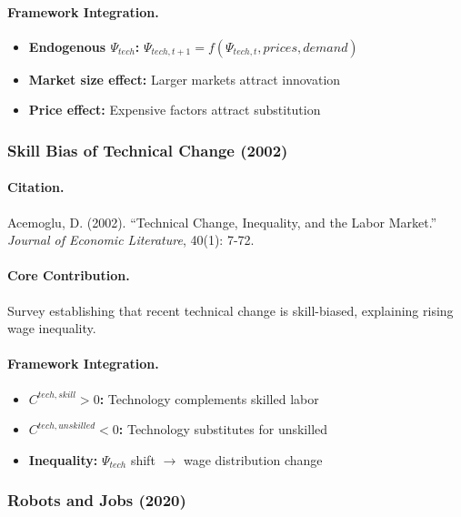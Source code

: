 \documentclass[12pt,a4paper]{article}
\begin{document}
\paragraph{Framework Integration.}
\begin{itemize}
  \item \textbf{Endogenous $\Psi_{tech}$:} $\Psi_{tech,t+1} = f(\Psi_{tech,t}, prices, demand)$
  \item \textbf{Market size effect:} Larger markets attract innovation
  \item \textbf{Price effect:} Expensive factors attract substitution
\end{itemize}

\subsubsection{Skill Bias of Technical Change (2002)}

\paragraph{Citation.}
Acemoglu, D. (2002). ``Technical Change, Inequality, and the Labor Market.''
\emph{Journal of Economic Literature}, 40(1): 7-72.

\paragraph{Core Contribution.}
Survey establishing that recent technical change is skill-biased,
explaining rising wage inequality.

\paragraph{Framework Integration.}
\begin{itemize}
  \item \textbf{$C^{tech,skill} > 0$:} Technology complements skilled labor
  \item \textbf{$C^{tech,unskilled} < 0$:} Technology substitutes for unskilled
  \item \textbf{Inequality:} $\Psi_{tech}$ shift $\to$ wage distribution change
\end{itemize}

\subsubsection{Robots and Jobs (2020)}
\end{document}
